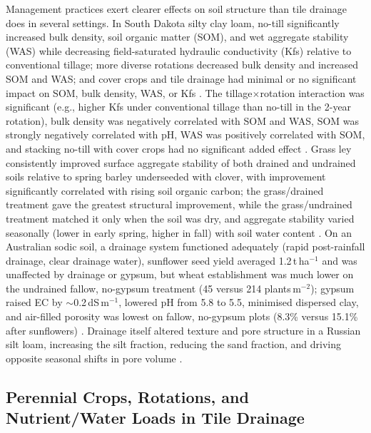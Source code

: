 \documentclass[11pt]{article}
\begin{document}
Management practices exert clearer effects on soil structure than tile drainage does in several settings. In South Dakota silty clay loam, no-till significantly increased bulk density, soil organic matter (SOM), and wet aggregate stability (WAS) while decreasing field-saturated hydraulic conductivity (Kfs) relative to conventional tillage; more diverse rotations decreased bulk density and increased SOM and WAS; and cover crops and tile drainage had minimal or no significant impact on SOM, bulk density, WAS, or Kfs \parencite{Saha2024}. The tillage$\times$rotation interaction was significant (e.g., higher Kfs under conventional tillage than no-till in the 2-year rotation), bulk density was negatively correlated with SOM and WAS, SOM was strongly negatively correlated with pH, WAS was positively correlated with SOM, and stacking no-till with cover crops had no significant added effect \parencite{Saha2024}. Grass ley consistently improved surface aggregate stability of both drained and undrained soils relative to spring barley underseeded with clover, with improvement significantly correlated with rising soil organic carbon; the grass/drained treatment gave the greatest structural improvement, while the grass/undrained treatment matched it only when the soil was dry, and aggregate stability varied seasonally (lower in early spring, higher in fall) with soil water content \parencite{Hermawan1996}. On an Australian sodic soil, a drainage system functioned adequately (rapid post-rainfall drainage, clear drainage water), sunflower seed yield averaged 1.2\,t\,ha$^{-1}$ and was unaffected by drainage or gypsum, but wheat establishment was much lower on the undrained fallow, no-gypsum treatment (45 versus 214 plants\,m$^{-2}$); gypsum raised EC by $\sim$0.2\,dS\,m$^{-1}$, lowered pH from 5.8 to 5.5, minimised dispersed clay, and air-filled porosity was lowest on fallow, no-gypsum plots (8.3\% versus 15.1\% after sunflowers) \parencite{GARDNER1991}. Drainage itself altered texture and pore structure in a Russian silt loam, increasing the silt fraction, reducing the sand fraction, and driving opposite seasonal shifts in pore volume \parencite{Brikmans2025}.

\subsection{Perennial Crops, Rotations, and Nutrient/Water Loads in Tile Drainage}
\end{document}
